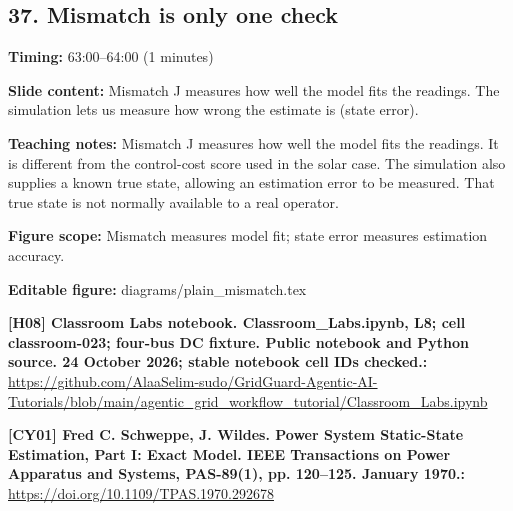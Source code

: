 \documentclass[10pt,letterpaper]{article}
\begin{document}
\subsection*{37. Mismatch is only one check}
\textbf{Timing:} 63:00--64:00 (1 minutes)\par
\textbf{Slide content:} Mismatch J measures how well the model fits the readings.
The simulation lets us measure how wrong the estimate is (state error).\par
\textbf{Teaching notes:} Mismatch J measures how well the model fits the readings. It is different from the control-cost score used in the solar case. The simulation also supplies a known true state, allowing an estimation error to be measured. That true state is not normally available to a real operator.\par
\textbf{Figure scope:} Mismatch measures model fit; state error measures estimation accuracy.\par
\textbf{Editable figure:} diagrams/plain\_mismatch.tex\par
\textbf{[H08] Classroom Labs notebook. Classroom\_Labs.ipynb, L8; cell classroom-023; four-bus DC fixture. Public notebook and Python source. 24 October 2026; stable notebook cell IDs checked.:} \href{https://github.com/AlaaSelim-sudo/GridGuard-Agentic-AI-Tutorials/blob/main/agentic_grid_workflow_tutorial/Classroom_Labs.ipynb}{\small\ttfamily https:/\allowbreak{}/\allowbreak{}github.\allowbreak{}com/\allowbreak{}AlaaSelim-\allowbreak{}sudo/\allowbreak{}GridGuard-\allowbreak{}Agentic-\allowbreak{}AI-\allowbreak{}Tutorials/\allowbreak{}blob/\allowbreak{}main/\allowbreak{}agentic\_\allowbreak{}grid\_\allowbreak{}workflow\_\allowbreak{}tutorial/\allowbreak{}Classroom\_\allowbreak{}Labs.\allowbreak{}ipynb}\par
\textbf{[CY01] Fred C. Schweppe, J. Wildes. Power System Static-State Estimation, Part I: Exact Model. IEEE Transactions on Power Apparatus and Systems, PAS-89(1), pp. 120--125. January 1970.:} \href{https://doi.org/10.1109/TPAS.1970.292678}{\small\ttfamily https:/\allowbreak{}/\allowbreak{}doi.\allowbreak{}org/\allowbreak{}10.\allowbreak{}1109/\allowbreak{}TPAS.\allowbreak{}1970.\allowbreak{}292678}\par
\par\medskip
\end{document}
